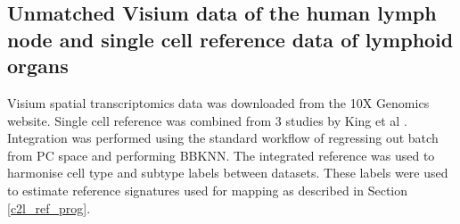 \documentclass[11pt,a4paper]{article}
\begin{document}
\subsection{Unmatched Visium data of the human lymph node and single cell reference data of lymphoid organs} \label{data_analysis_LN}

Visium spatial transcriptomics data was downloaded from the 10X Genomics website. Single cell reference was combined from 3 studies by King et al \cite{king_antibody_2020, james_distinct_2020, park_cell_2020}. Integration was performed using the standard workflow of regressing out batch from PC space and performing BBKNN. The integrated reference was used to harmonise cell type and subtype labels between datasets. These labels were used to estimate reference signatures used for mapping as described in Section \ref{c2l_ref_prog}.

\printbibliography
\end{document}
